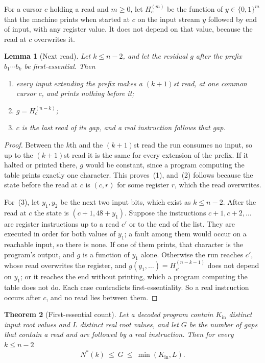 \documentclass[11pt]{article}
\newtheorem{theorem}{Theorem}[section]
\newtheorem{lemma}[theorem]{Lemma}
\theoremstyle{remark}
\begin{document}
For a cursor $c$ holding a read and $m\ge0$, let $H^{(m)}_c$ be the function
of $y\in\{0,1\}^m$ that the machine prints when started at $c$ on the input
stream $y$ followed by end of input, with any register value.  It does not
depend on that value, because the read at $c$ overwrites it.

\begin{lemma}[Next read]\label{lem:nextread}
Let $k\le n-2$, and let the residual $g$ after the prefix $b_1\cdots b_k$ be
first-essential.  Then
\begin{enumerate}
\item every input extending the prefix makes a $(k+1)$st read, at one
common cursor $c$, and prints nothing before it;
\item $g=H^{(n-k)}_c$;
\item $c$ is the last read of its gap, and a real instruction follows that
gap.
\end{enumerate}
\end{lemma}

\begin{proof}
Between the $k$th and the $(k+1)$st read the run consumes no input, so up to
the $(k+1)$st read it is the same for every extension of the prefix.  If it
halted or printed there, $g$ would be constant, since a program computing
the table prints exactly one character.  This proves~(1), and~(2) follows
because the state before the read at $c$ is $(c,r)$ for some register $r$,
which the read overwrites.

For~(3), let $y_1,y_2$ be the next two input bits, which exist as
$k\le n-2$.  After the read at $c$ the state is $(c+1,48+y_1)$.  Suppose the
instructions $c+1,c+2,\ldots$ are register instructions up to a read $c'$ or
to the end of the list.  They are executed in order for both values of
$y_1$; a fault among them would occur on a reachable input, so there is
none.  If one of them prints, that character is the program's output, and
$g$ is a function of $y_1$ alone.  Otherwise the run reaches $c'$, whose
read overwrites the register, and $g(y_1,\ldots)=H^{(n-k-1)}_{c'}$ does not
depend on $y_1$; or it reaches the end without printing, which a program
computing the table does not do.  Each case contradicts first-essentiality.
So a real instruction occurs after $c$, and no read lies between them.
\end{proof}

\begin{theorem}[First-essential count]\label{thm:count}
Let a decoded program contain $K_{\mathrm{in}}$ distinct input root values and $L$
distinct real root values, and let $G$ be the number of gaps that contain a
read and are followed by a real instruction.  Then for every $k\le n-2$
\[
  N^*(k)\ \le\ G\ \le\ \min(K_{\mathrm{in}},L).
\]
\end{theorem}
\end{document}
